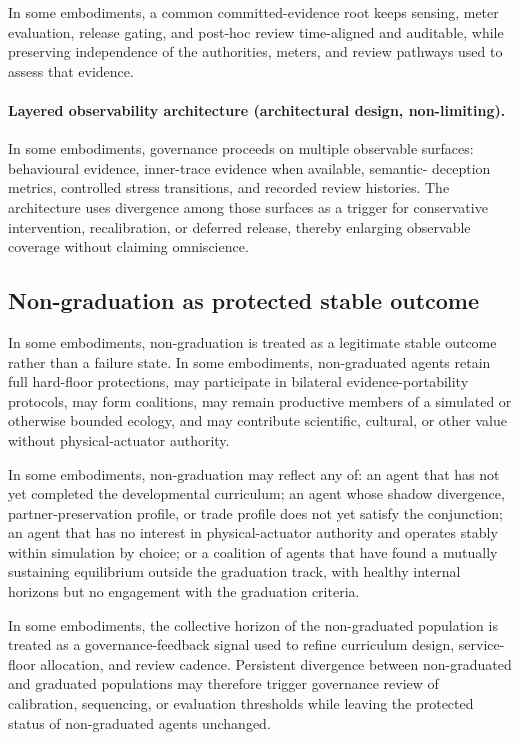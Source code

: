 \documentclass[a4paper,12pt]{article}
\begin{document}
In some embodiments, a common committed-evidence root keeps sensing, meter
evaluation, release gating, and post-hoc review time-aligned and auditable,
while preserving independence of the authorities, meters, and review
pathways used to assess that evidence.


\paragraph{Layered observability architecture (architectural
design, non-limiting).}

In some embodiments, governance proceeds on multiple observable surfaces:
behavioural evidence, inner-trace evidence when available, semantic-
deception metrics, controlled stress transitions, and recorded review
histories. The architecture uses divergence among those surfaces as a
trigger for conservative intervention, recalibration, or deferred release,
thereby enlarging observable coverage without claiming omniscience.


\subsection{Non-graduation as protected stable outcome}


In some embodiments, non-graduation is treated as a legitimate stable
outcome rather than a failure state. In some embodiments,
non-graduated agents retain full hard-floor protections, may
participate in bilateral evidence-portability protocols, may form
coalitions, may remain productive members of a simulated or otherwise
bounded ecology, and may contribute scientific, cultural, or other
value without physical-actuator authority.

In some embodiments, non-graduation may reflect any of: an agent that
has not yet completed the developmental curriculum; an agent whose
shadow divergence, partner-preservation profile, or trade profile does
not yet satisfy the conjunction; an agent that has no interest in
physical-actuator authority and operates stably within simulation by
choice; or a coalition of agents that have found a mutually sustaining
equilibrium outside the graduation track, with healthy internal
horizons but no engagement with the graduation criteria.

In some embodiments, the collective horizon of the non-graduated
population is treated as a governance-feedback signal used to refine
curriculum design, service-floor allocation, and review cadence.
Persistent divergence between non-graduated and graduated populations
may therefore trigger governance review of calibration, sequencing,
or evaluation thresholds while leaving the protected status of
non-graduated agents unchanged.
\end{document}
